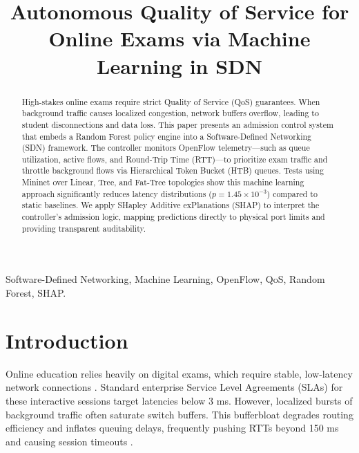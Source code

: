 \documentclass[journal]{IEEEtran}
\begin{document}
\title{Autonomous Quality of Service for Online Exams via Machine Learning in SDN}

\author{
}

\maketitle

\begin{abstract}
High-stakes online exams require strict Quality of Service (QoS) guarantees. When background traffic causes localized congestion, network buffers overflow, leading to student disconnections and data loss. This paper presents an admission control system that embeds a Random Forest policy engine into a Software-Defined Networking (SDN) framework. The controller monitors OpenFlow telemetry---such as queue utilization, active flows, and Round-Trip Time (RTT)---to prioritize exam traffic and throttle background flows via Hierarchical Token Bucket (HTB) queues. Tests using Mininet over Linear, Tree, and Fat-Tree topologies show this machine learning approach significantly reduces latency distributions ($p = 1.45 \times 10^{-3}$) compared to static baselines. We apply SHapley Additive exPlanations (SHAP) to interpret the controller's admission logic, mapping predictions directly to physical port limits and providing transparent auditability.
\end{abstract}

\begin{IEEEkeywords}
Software-Defined Networking, Machine Learning, OpenFlow, QoS, Random Forest, SHAP.
\end{IEEEkeywords}

\section{Introduction}
Online education relies heavily on digital exams, which require stable, low-latency network connections \cite{ref1, ref2}. Standard enterprise Service Level Agreements (SLAs) for these interactive sessions target latencies below 3 ms. However, localized bursts of background traffic often saturate switch buffers. This bufferbloat degrades routing efficiency and inflates queuing delays, frequently pushing RTTs beyond 150 ms and causing session timeouts \cite{ref3}.
\end{document}
